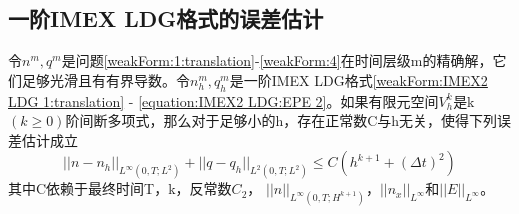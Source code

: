 \subsection{一阶IMEX LDG格式的误差估计}
\begin{theorem}
    令$n^m,q^m$是问题\eqref{weakForm:1:translation}-\ref{weakForm:4}在时间层级m的精确解，它们足够光滑且有有界导数。令$n_h^m,q_h^m$是一阶IMEX LDG格式\eqref{weakForm:IMEX2 LDG 1:translation} - \ref{equation:IMEX2 LDG:EPE 2}。如果有限元空间$V_h^k$是k$(k\geq  0)$阶间断多项式，那么对于足够小的h，存在正常数C与h无关，使得下列误差估计成立
    \begin{equation}
        ||n-n_h||_{L^{\infty}(0,T;L^2)} + ||q - q_h||_{L^2(0,T;L^2)} \leq C(h^{k+1} + (\Delta t)^2)
    \end{equation}
    其中C依赖于最终时间T，k，反常数$C_2$， $||n||_{L^{\infty}(0,T;H^{k+1})}$，$||n_x||_{L^{\infty}}$和$||E||_{L^{\infty}}$。
\end{theorem}
